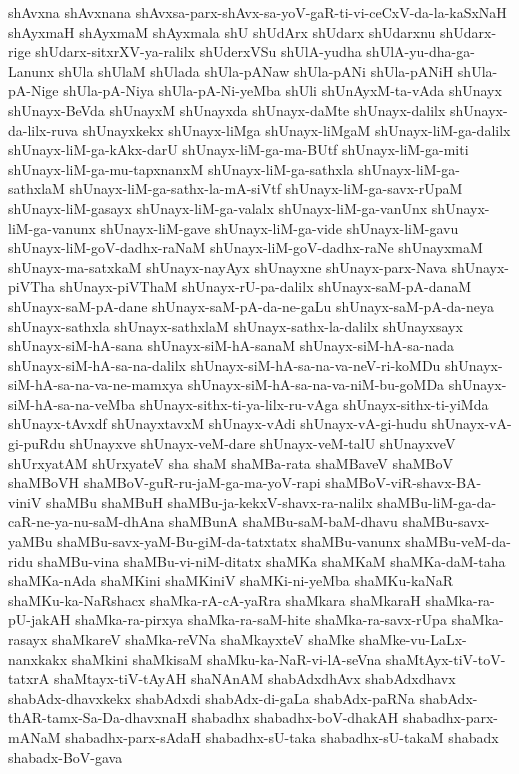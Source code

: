 {shAvxna
shAvxnana
shAvxsa-parx-shAvx-sa-yoV-gaR-ti-vi-ceCxV-da-la-kaSxNaH
shAyxmaH
shAyxmaM
shAyxmala
shU
shUdArx
shUdarx
shUdarxnu
shUdarx-rige
shUdarx-sitxrXV-ya-ralilx
shUderxVSu
shUlA-yudha
shUlA-yu-dha-ga-Lanunx
shUla
shUlaM
shUlada
shUla-pANaw
shUla-pANi
shUla-pANiH
shUla-pA-Nige
shUla-pA-Niya
shUla-pA-Ni-yeMba
shUli
shUnAyxM-ta-vAda
shUnayx
shUnayx-BeVda
shUnayxM
shUnayxda
shUnayx-daMte
shUnayx-dalilx
shUnayx-da-lilx-ruva
shUnayxkekx
shUnayx-liMga
shUnayx-liMgaM
shUnayx-liM-ga-dalilx
shUnayx-liM-ga-kAkx-darU
shUnayx-liM-ga-ma-BUtf
shUnayx-liM-ga-miti
shUnayx-liM-ga-mu-tapxnanxM
shUnayx-liM-ga-sathxla
shUnayx-liM-ga-sathxlaM
shUnayx-liM-ga-sathx-la-mA-siVtf
shUnayx-liM-ga-savx-rUpaM
shUnayx-liM-gasayx
shUnayx-liM-ga-valalx
shUnayx-liM-ga-vanUnx
shUnayx-liM-ga-vanunx
shUnayx-liM-gave
shUnayx-liM-ga-vide
shUnayx-liM-gavu
shUnayx-liM-goV-dadhx-raNaM
shUnayx-liM-goV-dadhx-raNe
shUnayxmaM
shUnayx-ma-satxkaM
shUnayx-nayAyx
shUnayxne
shUnayx-parx-Nava
shUnayx-piVTha
shUnayx-piVThaM
shUnayx-rU-pa-dalilx
shUnayx-saM-pA-danaM
shUnayx-saM-pA-dane
shUnayx-saM-pA-da-ne-gaLu
shUnayx-saM-pA-da-neya
shUnayx-sathxla
shUnayx-sathxlaM
shUnayx-sathx-la-dalilx
shUnayxsayx
shUnayx-siM-hA-sana
shUnayx-siM-hA-sanaM
shUnayx-siM-hA-sa-nada
shUnayx-siM-hA-sa-na-dalilx
shUnayx-siM-hA-sa-na-va-neV-ri-koMDu
shUnayx-siM-hA-sa-na-va-ne-mamxya
shUnayx-siM-hA-sa-na-va-niM-bu-goMDa
shUnayx-siM-hA-sa-na-veMba
shUnayx-sithx-ti-ya-lilx-ru-vAga
shUnayx-sithx-ti-yiMda
shUnayx-tAvxdf
shUnayxtavxM
shUnayx-vAdi
shUnayx-vA-gi-hudu
shUnayx-vA-gi-puRdu
shUnayxve
shUnayx-veM-dare
shUnayx-veM-talU
shUnayxveV
shUrxyatAM
shUrxyateV
sha
shaM
shaMBa-rata
shaMBaveV
shaMBoV
shaMBoVH
shaMBoV-guR-ru-jaM-ga-ma-yoV-rapi
shaMBoV-viR-shavx-BA-viniV
shaMBu
shaMBuH
shaMBu-ja-kekxV-shavx-ra-nalilx
shaMBu-liM-ga-da-caR-ne-ya-nu-saM-dhAna
shaMBunA
shaMBu-saM-baM-dhavu
shaMBu-savx-yaMBu
shaMBu-savx-yaM-Bu-giM-da-tatxtatx
shaMBu-vanunx
shaMBu-veM-da-ridu
shaMBu-vina
shaMBu-vi-niM-ditatx
shaMKa
shaMKaM
shaMKa-daM-taha
shaMKa-nAda
shaMKini
shaMKiniV
shaMKi-ni-yeMba
shaMKu-kaNaR
shaMKu-ka-NaRshacx
shaMka-rA-cA-yaRra
shaMkara
shaMkaraH
shaMka-ra-pU-jakAH
shaMka-ra-pirxya
shaMka-ra-saM-hite
shaMka-ra-savx-rUpa
shaMka-rasayx
shaMkareV
shaMka-reVNa
shaMkayxteV
shaMke
shaMke-vu-LaLx-nanxkakx
shaMkini
shaMkisaM
shaMku-ka-NaR-vi-lA-seVna
shaMtAyx-tiV-toV-tatxrA
shaMtayx-tiV-tAyAH
shaNAnAM
shabAdxdhAvx
shabAdxdhavx
shabAdx-dhavxkekx
shabAdxdi
shabAdx-di-gaLa
shabAdx-paRNa
shabAdx-thAR-tamx-Sa-Da-dhavxnaH
shabadhx
shabadhx-boV-dhakAH
shabadhx-parx-mANaM
shabadhx-parx-sAdaH
shabadhx-sU-taka
shabadhx-sU-takaM
shabadx
shabadx-BoV-gava
}
